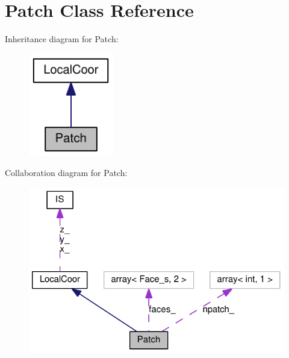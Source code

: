 \hypertarget{classPatch}{
\section{Patch Class Reference}
\label{classPatch}
}
Inheritance diagram for Patch:\nopagebreak
\begin{figure}[H]
\begin{center}
\leavevmode
\includegraphics[width=105pt]{classPatch__inherit__graph}
\end{center}
\end{figure}
Collaboration diagram for Patch:\nopagebreak
\begin{figure}[H]
\begin{center}
\leavevmode
\includegraphics[width=320pt]{classPatch__coll__graph}
\end{center}
\end{figure}
